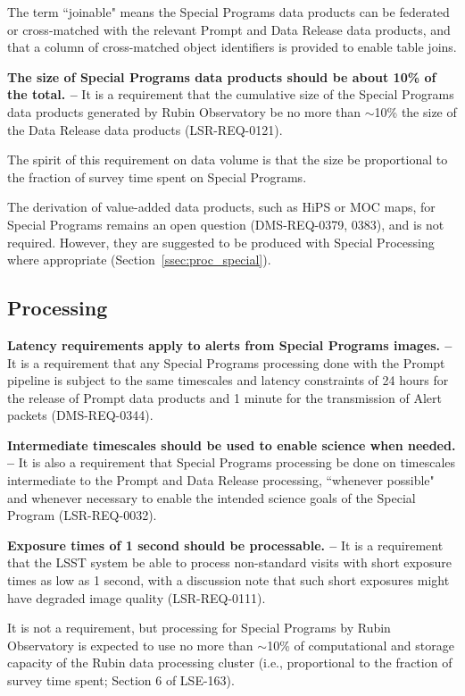 The term ``joinable" means the Special Programs data products can be federated 
or cross-matched with the relevant Prompt and Data Release data products, and that
a column of cross-matched object identifiers is provided to enable table joins.

\textbf{The size of Special Programs data products should be about 10\% of the total. --}
It is a requirement that the cumulative size of the Special Programs data 
products generated by Rubin Observatory be no more than $\sim$10\% the 
size of the Data Release data products (LSR-REQ-0121).

The spirit of this requirement on data volume is that the size be proportional to the fraction 
of survey time spent on Special Programs.

The derivation of value-added data products, such as HiPS or MOC maps, for 
Special Programs remains an open question (DMS-REQ-0379, 0383), and is not required.
However, they are suggested to be produced with Special Processing where
appropriate (Section~\ref{ssec:proc_special}).

\subsection{Processing}\label{ssec:req_proc}

\textbf{Latency requirements apply to alerts from Special Programs images. --}
It is a requirement that any Special Programs processing done with the 
Prompt pipeline is subject to the same 
timescales and latency constraints of 24 hours for the release of Prompt 
data products and 1 minute for the transmission of Alert packets 
(DMS-REQ-0344).

\textbf{Intermediate timescales should be used to enable science when needed. --}
It is also a requirement that Special Programs processing be done on 
timescales intermediate to the Prompt and Data Release processing, 
``whenever possible" and whenever necessary to enable the intended science 
goals of the Special Program (LSR-REQ-0032).

\textbf{Exposure times of 1 second should be processable. -- }
It is a requirement that the LSST system be able to process non-standard 
visits with short exposure times as low as 1 second, with a discussion 
note that such short exposures might have degraded image quality 
(LSR-REQ-0111).

It is not a requirement, but processing for Special Programs by Rubin Observatory is expected to use no 
more than $\sim$10\% of computational and storage capacity of the Rubin data processing cluster 
(i.e., proportional to the fraction of survey time spent; Section 6 of LSE-163).


